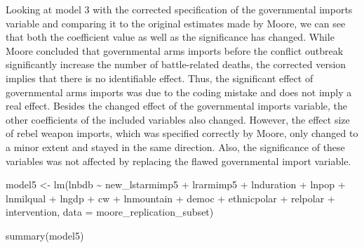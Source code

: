 \documentclass[
]{article}
\newenvironment{Shaded}{\begin{snugshade}}{\end{snugshade}}
\newcommand{\AttributeTok}[1]{\textcolor[rgb]{0.77,0.63,0.00}{#1}}
\newcommand{\FunctionTok}[1]{\textcolor[rgb]{0.00,0.00,0.00}{#1}}
\newcommand{\NormalTok}[1]{#1}
\newcommand{\OtherTok}[1]{\textcolor[rgb]{0.56,0.35,0.01}{#1}}
\newcommand{\SpecialCharTok}[1]{\textcolor[rgb]{0.00,0.00,0.00}{#1}}
\begin{document}
Looking at model 3 with the corrected specification of the governmental
imports variable and comparing it to the original estimates made by
Moore, we can see that both the coefficient value as well as the
significance has changed. While Moore concluded that governmental arms
imports before the conflict outbreak significantly increase the number
of battle-related deaths, the corrected version implies that there is no
identifiable effect. Thus, the significant effect of governmental arms
imports was due to the coding mistake and does not imply a real effect.
Besides the changed effect of the governmental imports variable, the
other coefficients of the included variables also changed. However, the
effect size of rebel weapon imports, which was specified correctly by
Moore, only changed to a minor extent and stayed in the same direction.
Also, the significance of these variables was not affected by replacing
the flawed governmental import variable.

\begin{Shaded}
\begin{Highlighting}[]
\NormalTok{model5 }\OtherTok{\textless{}{-}} \FunctionTok{lm}\NormalTok{(lnbdb }\SpecialCharTok{\textasciitilde{}}\NormalTok{ new\_lstarmimp5 }\SpecialCharTok{+}\NormalTok{ lrarmimp5 }\SpecialCharTok{+}\NormalTok{ lnduration }\SpecialCharTok{+}\NormalTok{ lnpop }\SpecialCharTok{+}\NormalTok{ lnmilqual }\SpecialCharTok{+}\NormalTok{ lngdp }\SpecialCharTok{+}\NormalTok{ cw }\SpecialCharTok{+}\NormalTok{ lnmountain }\SpecialCharTok{+}\NormalTok{ democ }\SpecialCharTok{+}\NormalTok{ ethnicpolar }\SpecialCharTok{+}\NormalTok{ relpolar }\SpecialCharTok{+}\NormalTok{ intervention, }\AttributeTok{data =}\NormalTok{ moore\_replication\_subset)}

\FunctionTok{summary}\NormalTok{(model5)}
\end{Highlighting}
\end{Shaded}
\end{document}
